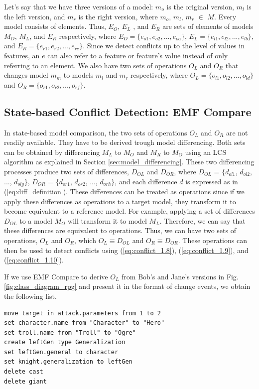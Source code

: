 Let's say that we have three versions of a model: $m_{o}$ is the original version, $m_{l}$ is the left version, and $m_{r}$ is the right version, where $m_{o}$, $m_{l}$, $m_{r}$ $\in$ $M$. 
Every model consists of elements. Thus, $E_{O}$, $E_{L}$ , and $E_{R}$ are sets of elements of models $M_{O}$, $M_{L}$, and $E_{R}$ respectively, where $E_{O}=\{e_{o1}, e_{o2}, ..., e_{oa}\}$, $E_{L}=\{e_{l1}, e_{l2}, ..., e_{lb}\}$, and $E_{R}=\{e_{r1}, e_{r2}, ..., e_{rc}\}$. Since we detect conflicts up to the level of values in features, an $e$ can also refer to a feature or feature's value instead of only referring to an element. We also have two sets of operations $O_{L}$ and $O_{R}$ that changes model $m_{m}$ to models $m_{l}$ and $m_{r}$ respectively, where $O_{L}=\{o_{l1}, o_{l2}, ..., o_{ld}\}$ and $O_{R}=\{o_{r1}, o_{r2}, ..., o_{rf}\}$. 

\subsection{State-based Conflict Detection: EMF Compare}
\label{sec:state_based_conflict_detection_emf_compare}
In state-based model comparison, the two sets of operations $O_{L}$ and $O_{R}$ are not readily available. They have to be derived trough model differencing. Both sets can be obtained by differencing $M_{L}$ to $M_{O}$ and $M_{R}$ to $M_{O}$ using an LCS algorithm as explained in Section \ref{sec:model_differencing}. These two differencing processes produce two sets of differences, $D_{OL}$ and $D_{OR}$, where $D_{OL}$ = $\{d_{ol1}$, $d_{ol2}$, ..., $d_{olg}\}$, $D_{OR}$ = $\{d_{or1}$, $d_{or2}$, ..., $d_{orh}\}$, and each difference $d$ is expressed as in (\ref{eq:diff_definition}). These differences can be treated as operations since if we apply these differences as operations to a target model, they transform it to become equivalent to a reference model. For example, applying a set of differences $D_{OL}$ to a model $M_{O}$ will transform it to model $M_{L}$. Therefore, we can say that these differences are equivalent to operations. Thus, we can have two sets of operations, $O_{L}$ and $O_{R}$, which $O_{L} \equiv D_{OL}$ and $O_{R} \equiv D_{OR}$. These operations can then be used to detect conflicts using (\ref{eq:conflict_1.8}), (\ref{eq:conflict_1.9}), and (\ref{eq:conflict_1.10}).  

If we use EMF Compare to derive $O_{L}$ from Bob's and Jane's versions in Fig. \ref{fig:class_diagram_rpg} and present it in the format of change events, we obtain the following list. 
\begin{lstlisting}[firstnumber=1,style=eol,caption={The derived change events (operations) made by Bob to produce the right model in Fig. \ref{fig:class_diagram_left} (right version).},label=lst:cbp_left_state]
move target in attack.parameters from 1 to 2
set character.name from "Character" to "Hero"
set troll.name from "Troll" to "Ogre"
create leftGen type Generalization
set leftGen.general to character
set knight.generalization to leftGen
delete cast
delete giant
\end{lstlisting}

